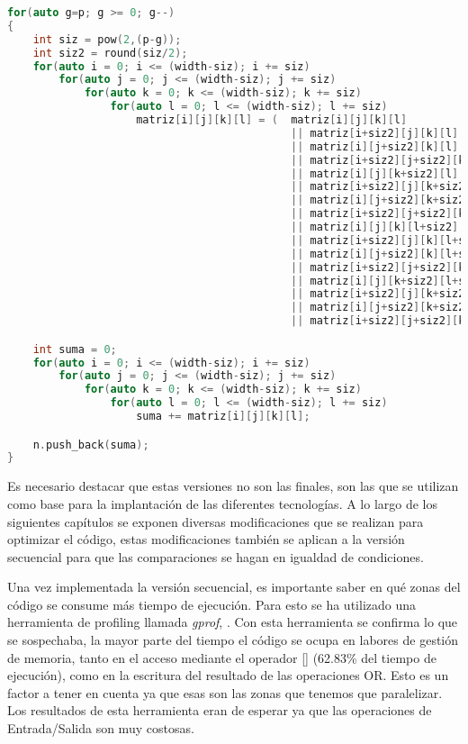 \newpage
\begin{lstlisting}[language=C++,caption={Primera versión del Boxcount4D programado en C++},label=CppBox4D,basicstyle=\tiny]
for(auto g=p; g >= 0; g--)
{
    int siz = pow(2,(p-g));
    int siz2 = round(siz/2);
    for(auto i = 0; i <= (width-siz); i += siz)
        for(auto j = 0; j <= (width-siz); j += siz)
            for(auto k = 0; k <= (width-siz); k += siz)
                for(auto l = 0; l <= (width-siz); l += siz)
                    matriz[i][j][k][l] = (  matriz[i][j][k][l] 
                                            || matriz[i+siz2][j][k][l] 
                                            || matriz[i][j+siz2][k][l] 
                                            || matriz[i+siz2][j+siz2][k][l] 
                                            || matriz[i][j][k+siz2][l] 
                                            || matriz[i+siz2][j][k+siz2][l] 
                                            || matriz[i][j+siz2][k+siz2][l] 
                                            || matriz[i+siz2][j+siz2][k+siz2][l] 
                                            || matriz[i][j][k][l+siz2] 
                                            || matriz[i+siz2][j][k][l+siz2] 
                                            || matriz[i][j+siz2][k][l+siz2] 
                                            || matriz[i+siz2][j+siz2][k][l+siz2] 
                                            || matriz[i][j][k+siz2][l+siz2] 
                                            || matriz[i+siz2][j][k+siz2][l+siz2] 
                                            || matriz[i][j+siz2][k+siz2][l+siz2] 
                                            || matriz[i+siz2][j+siz2][k+siz2][l+siz2] );

    int suma = 0; 
    for(auto i = 0; i <= (width-siz); i += siz)
        for(auto j = 0; j <= (width-siz); j += siz)
            for(auto k = 0; k <= (width-siz); k += siz)
                for(auto l = 0; l <= (width-siz); l += siz)
                    suma += matriz[i][j][k][l];

    n.push_back(suma);
}
\end{lstlisting}

Es necesario destacar que estas versiones no son las finales, son las que se utilizan como base para la implantación de las diferentes tecnologías. A lo largo de los siguientes capítulos se exponen diversas modificaciones que se realizan para optimizar el código, estas modificaciones también se aplican a la versión secuencial para que las comparaciones se hagan en igualdad de condiciones.

Una vez implementada la versión secuencial, es importante saber en qué zonas del código se consume más tiempo de ejecución. Para esto se ha utilizado una herramienta de profiling llamada \textit{gprof}, \cite{unknown-author-no-dateI}. Con esta herramienta se confirma lo que se sospechaba, la mayor parte del tiempo el código se ocupa en labores de gestión de memoria, tanto en el acceso mediante el operador [] (62.83\% del tiempo de ejecución), como en la escritura del resultado de las operaciones OR. Esto es un factor a tener en cuenta ya que esas son las zonas que tenemos que paralelizar. Los resultados de esta herramienta eran de esperar ya que las operaciones de Entrada/Salida son muy costosas.